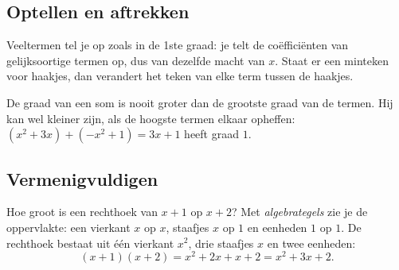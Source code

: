 
\begin{oefeningen}
\end{oefeningen}

\subsection{Optellen en aftrekken}

Veeltermen tel je op zoals in de 1ste graad: je telt de coëfficiënten van gelijksoortige termen op, dus van dezelfde macht van $x$. Staat er een minteken voor haakjes, dan verandert het teken van elke term tussen de haakjes.


De graad van een som is nooit groter dan de grootste graad van de termen. Hij kan wel kleiner zijn, als de hoogste termen elkaar opheffen: $(x^2 + 3x) + (-x^2 + 1) = 3x + 1$ heeft graad $1$.

\begin{oefeningen}
\end{oefeningen}

\subsection{Vermenigvuldigen}

Hoe groot is een rechthoek van $x + 1$ op $x + 2$? Met \textit{algebrategels} zie je de oppervlakte: een vierkant $x$ op $x$, staafjes $x$ op $1$ en eenheden $1$ op $1$. De rechthoek bestaat uit één vierkant $x^2$, drie staafjes $x$ en twee eenheden:
\[(x + 1)(x + 2) = x^2 + 2x + x + 2 = x^2 + 3x + 2.\]

